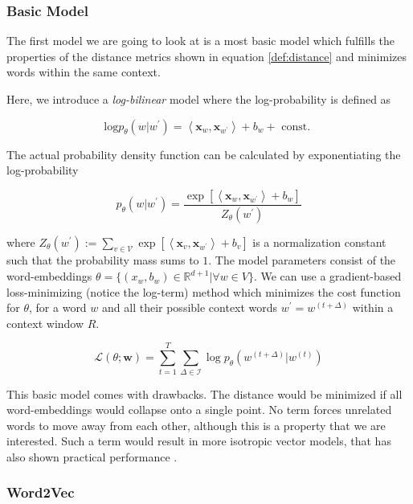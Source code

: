 \documentclass[a4paper,12pt,oneside,openright]{report}
\begin{document}
\subsubsection{Basic Model}

The first model we are going to look at is a most basic model which fulfills the properties of the distance metrics shown in equation \eqref{def:distance} and minimizes words within the same context.

Here, we introduce a \textit{log-bilinear} \cite{cil_slides} model where the log-probability is defined as

\begin{equation}
\text{log} p_{\theta}(w | w^{\prime}) = \left\langle\mathbf{x}_{w}, \mathbf{x}_{w^{\prime}}\right\rangle+b_{w} + \text { const. }
\end{equation}

The actual probability density function can be calculated by exponentiating the log-probability

$$
p_{\theta}\left(w | w^{\prime}\right)=\frac{\exp \left[\left\langle\mathbf{x}_{w}, \mathbf{x}_{w^{\prime}}\right\rangle+b_{w}\right]}{Z_{\theta}\left(w^{\prime}\right)}
$$

where $Z_{\theta}\left(w^{\prime}\right):=\sum_{v \in \mathcal{V}} \exp \left[\left\langle\mathbf{x}_{v}, \mathbf{x}_{w^{\prime}}\right\rangle+b_{v}\right]$ is a normalization constant such that the probability mass sums to $1$.
The model parameters consist of the word-embeddings $  \theta = \{ (x_w, b_w ) \in \mathbb{R}^{d+1} | \forall w \in V \}$.
We can use a gradient-based loss-minimizing (notice the log-term) method which minimizes the cost function for $\theta$, for a word $w$ and all their possible context words $w^{\prime} = w^{(t+\Delta)}$ within a context window $R$.

$$
\mathcal{L}(\theta ; \mathbf{w})=\sum_{t=1}^{T} \sum_{\Delta \in \mathcal{I}} \log p_{\theta}\left(w^{(t+\Delta)} | w^{(t)}\right)
$$

This basic model comes with drawbacks. 
The distance would be minimized if all word-embeddings would collapse onto a single point. 
No term forces unrelated words to move away from each other, although this is a property that we are interested.
Such a term would result in more isotropic vector models, that has also shown practical performance \cite{ethayarajh19}.


\subsubsection{Word2Vec}
\end{document}
